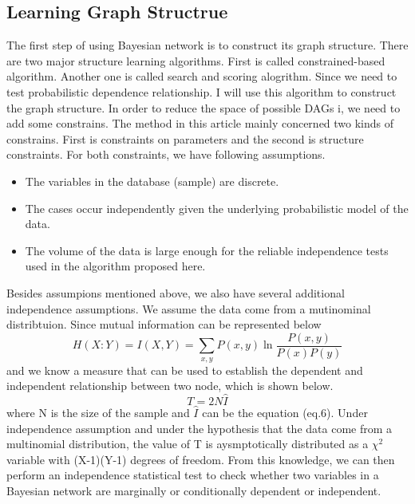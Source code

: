 \documentclass{article}
\begin{document}
\subsection{Learning Graph Structrue}
The first step of using Bayesian network is to construct its graph structure.
There are two major structure learning algorithms. First is called constrained-based
algorithm. Another one is called search and scoring alogrithm. Since we need
to test probabilistic dependence relationship. I will use this algorithm to construct the
graph structure.
In order to reduce the space of possible DAGs i, we need to add some constrains. The method in
this article mainly concerned two kinds of constrains. First is constraints on parameters and 
the second is structure constraints.
For both constraints, we have following assumptions.

\begin{itemize}
		\item The variables in the database (sample) are discrete. 
		\item The cases occur independently given the underlying probabilistic model of the data.
		\item The volume of the data is large enough for the reliable independence tests used in the algorithm proposed here. 

\end{itemize}
Besides assumpions mentioned above, we also have several additional independence assumptions.
We assume the data come from a mutinominal distribtuion. Since mutual information 
can be represented below
\begin{equation}
		H(X:Y)=I(X,Y)=\sum_{x,y}P(x,y)\ln \frac{P(x,y)}{P(x)P(y)}
\end{equation}
and we know a measure that can be used to establish the dependent and independent relationship
between two node, which is shown below.
\begin{equation}
		T = 2 N \hat I
\end{equation}
where N is the size of the sample and $\hat I$ can be the equation (eq.6).
Under independence assumption and under the hypothesis that the data come from
a multinomial distribution, the value of T is aysmptotically distributed as a 
$\chi^2$ variable with (X-1)(Y-1) degrees of freedom. From this knowledge,
we can then perform an independence statistical test to check whether two variables
in a Bayesian network are marginally or conditionally dependent or independent.
\end{document}
